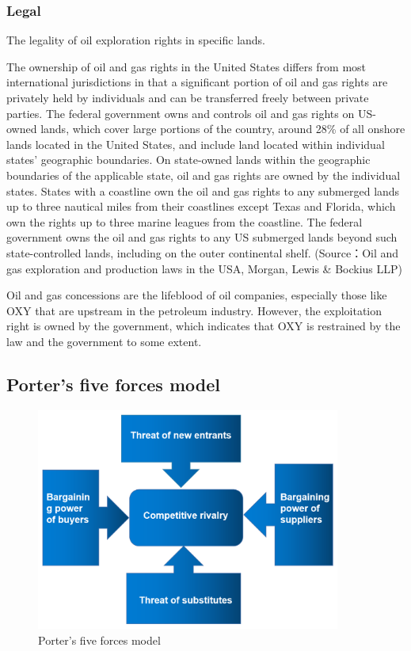 \documentclass[
	a4paper, %
	12pt,%
]{CSSullivanBusinessReport}
\begin{document}
\begin{fullwidth}
\subsubsection{Legal}
The legality of oil exploration rights in specific lands.
\par
The ownership of oil and gas rights in the United States differs from most international jurisdictions in that a significant portion of oil and gas rights are privately held by individuals  and can be transferred freely between private parties. The federal government owns and controls oil and gas rights on US-owned lands, which cover large portions of the country, around 28\% of all onshore lands located in the United States, and include land located within individual states’ geographic boundaries. On state-owned lands within the geographic boundaries of the applicable state, oil and gas rights are owned by the individual states. States with a coastline own the oil and gas rights to any submerged lands up to three nautical miles from their coastlines except Texas and Florida, which own the rights up to three marine leagues from the coastline. The federal government owns the oil and gas rights to any US submerged lands beyond such state-controlled lands, including on the outer continental shelf. (Source：Oil and gas exploration and production laws in the USA, Morgan, Lewis & Bockius LLP)
\par
Oil and gas concessions are the lifeblood of oil companies, especially those like OXY that are upstream in the petroleum industry. However, the exploitation right is owned by the government, which indicates that OXY is restrained by the law and the government to some extent.
\subsection{Porter’s five forces model}
\begin{figure}
    \centering
    \includegraphics[width=10cm]{Images/Five forces.png}
    \caption{Porter's five forces model}
    \label{five forces}
\end{figure}

\end{fullwidth}
\end{document}
